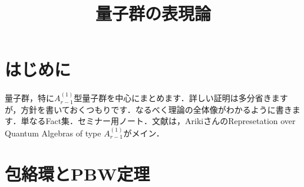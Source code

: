 \documentclass[dvipdfmx,autodetect-engine]{article}
\title{量子群の表現論}
\author{}
\date{}
\begin{document}
\maketitle
\section{はじめに}
\label{sec_intro}
      量子群，特に$A_{r-1}^{(1)}$型量子群を中心にまとめます．詳しい証明は多分省きますが，方針を書いておくつもりです．なるべく理論の全体像がわかるように書きます．単なるFact集．セミナー用ノート．文献は，ArikiさんのRepresetation over Quantum Algebras of type $A_{r-1}^{(1)}$がメイン．
\section{包絡環とPBW定理}
\label{sec_enveloping_algebras}
\end{document}
